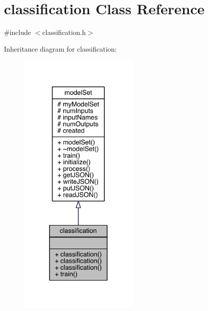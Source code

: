 \hypertarget{classclassification}{}\section{classification Class Reference}
\label{classclassification}


{\ttfamily \#include $<$classification.\+h$>$}



Inheritance diagram for classification\+:\nopagebreak
\begin{figure}[H]
\begin{center}
\leavevmode
\includegraphics[width=168pt]{classclassification__inherit__graph}
\end{center}
\end{figure}


